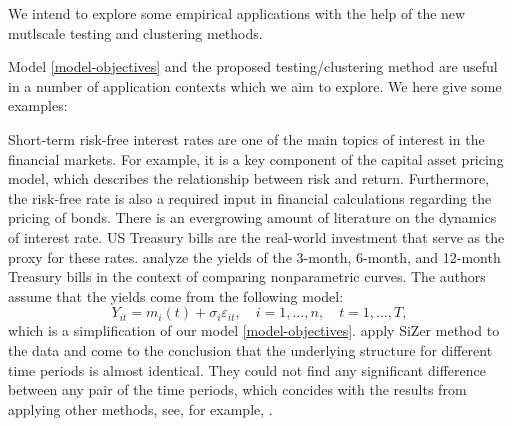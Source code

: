 \documentclass[a4paper,12pt]{article}
\begin{document}
We intend to explore some empirical applications with the help of the new mutlscale testing and clustering methods. 

Model \eqref{model-objectives} and the proposed testing/clustering method are useful in a number of application contexts which we aim to explore. We here give some examples: 

\begin{example}
Short-term risk-free interest rates are one of the main topics of interest in the financial markets. For example, it is a key component of the capital asset pricing model, which describes the relationship between risk and return. Furthermore, the risk-free rate is also a required input in financial calculations regarding the pricing of bonds. There is an evergrowing amount of literature on the dynamics of interest rate. US Treasury bills are the real-world investment that serve as the proxy for these rates. \cite{Park2009} analyze the yields of the 3-month, 6-month, and 12-month Treasury bills in the context of comparing nonparametric curves. The authors assume that the yields come from the following model:
\begin{equation}\label{model-park}
Y_{it} = m_i(t) + \sigma_i \varepsilon_{it}, \quad i=1,\ldots, n, \quad t=1,\ldots,T,
\end{equation}
which is a simplification of our model \eqref{model-objectives}. \cite{Park2009} apply Si{Z}er method to the data and come to the conclusion that the underlying structure for different time periods is almost identical. They could not find any significant difference between any pair of the time periods, which concides with the results from applying other methods, see, for example, \cite{Fan2008}.
\end{example}
\end{document}
